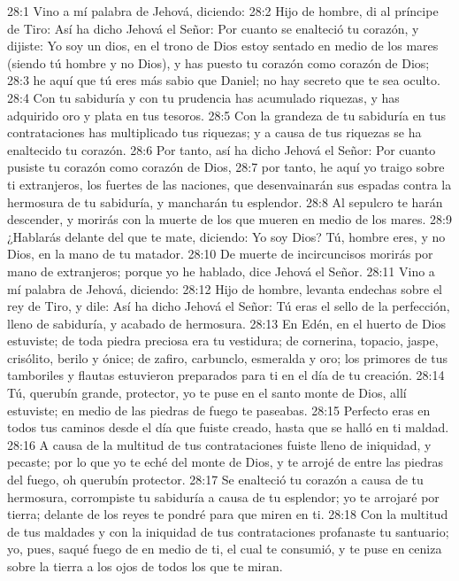28:1 Vino a mí palabra de Jehová, diciendo:   
28:2 Hijo de hombre, di al príncipe de Tiro: Así ha dicho Jehová el Señor: Por cuanto se enalteció tu corazón, y dijiste: Yo soy un dios, en el trono de Dios estoy sentado en medio de los mares (siendo tú hombre y no Dios), y has puesto tu corazón como corazón de Dios;   
28:3 he aquí que tú eres más sabio que Daniel; no hay secreto que te sea oculto.   
28:4 Con tu sabiduría y con tu prudencia has acumulado riquezas, y has adquirido oro y plata en tus tesoros.   
28:5 Con la grandeza de tu sabiduría en tus contrataciones has multiplicado tus riquezas; y a causa de tus riquezas se ha enaltecido tu corazón.   
28:6 Por tanto, así ha dicho Jehová el Señor: Por cuanto pusiste tu corazón como corazón de Dios,   
28:7 por tanto, he aquí yo traigo sobre ti extranjeros, los fuertes de las naciones, que desenvainarán sus espadas contra la hermosura de tu sabiduría, y mancharán tu esplendor.   
28:8 Al sepulcro te harán descender, y morirás con la muerte de los que mueren en medio de los mares.   
28:9 ¿Hablarás delante del que te mate, diciendo: Yo soy Dios? Tú, hombre eres, y no Dios, en la mano de tu matador.   
28:10 De muerte de incircuncisos morirás por mano de extranjeros; porque yo he hablado, dice Jehová el Señor.   
28:11 Vino a mí palabra de Jehová, diciendo:   
28:12 Hijo de hombre, levanta endechas sobre el rey de Tiro, y dile: Así ha dicho Jehová el Señor: Tú eras el sello de la perfección, lleno de sabiduría, y acabado de hermosura.   
28:13 En Edén, en el huerto de Dios estuviste; de toda piedra preciosa era tu vestidura; de cornerina, topacio, jaspe, crisólito, berilo y ónice; de zafiro, carbunclo, esmeralda y oro; los primores de tus tamboriles y flautas estuvieron preparados para ti en el día de tu creación.   
28:14 Tú, querubín grande, protector, yo te puse en el santo monte de Dios, allí estuviste; en medio de las piedras de fuego te paseabas.   
28:15 Perfecto eras en todos tus caminos desde el día que fuiste creado, hasta que se halló en ti maldad.   
28:16 A causa de la multitud de tus contrataciones fuiste lleno de iniquidad, y pecaste; por lo que yo te eché del monte de Dios, y te arrojé de entre las piedras del fuego, oh querubín protector.   
28:17 Se enalteció tu corazón a causa de tu hermosura, corrompiste tu sabiduría a causa de tu esplendor; yo te arrojaré por tierra; delante de los reyes te pondré para que miren en ti.   
28:18 Con la multitud de tus maldades y con la iniquidad de tus contrataciones profanaste tu santuario; yo, pues, saqué fuego de en medio de ti, el cual te consumió, y te puse en ceniza sobre la tierra a los ojos de todos los que te miran.   
